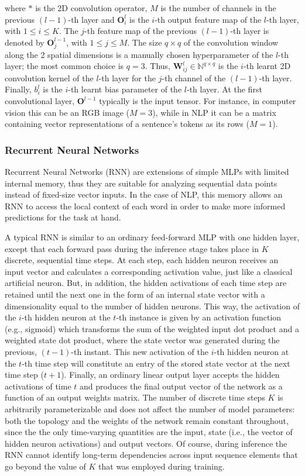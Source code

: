\documentclass[preprint,review,10pt]{elsarticle}
\begin{document}
	\noindent where $*$ is the 2D convolution operator, $M$ is the number of channels in the previous $(l-1)$-th layer and $\mathbf{O}_i^l$ is the $i$-th output feature map of the $l$-th layer, with $1 \leq i \leq K$. The $j$-th feature map of the previous $(l-1)$-th layer is denoted by $\mathbf{O}_j^{l-1}$, with $1 \leq j \leq M$. The size $q \times q$ of the convolution window along the 2 spatial dimensions is a manually chosen hyperparameter of the $l$-th layer; the most common choice is $q = 3$. Thus, $\mathbf{W}_{ij}^l \in \mathbb{N}^{q \times q}$ is the $i$-th learnt 2D convolution kernel of the $l$-th layer for the $j$-th channel of the $(l-1)$-th layer. Finally, $b_i^l$ is the $i$-th learnt bias parameter of the $l$-th layer. At the first convolutional layer, $\mathbf{O}^{l-1}$  typically is the input tensor. For instance, in computer vision this can be an RGB image ($M = 3$), while in NLP it can be a matrix containing vector representations of a sentence's tokens as its rows ($M = 1$).
	
	\subsubsection{Recurrent Neural Networks}
	Recurrent Neural Networks (RNN) are extensions of simple MLPs with limited internal memory, thus they are suitable for analyzing sequential data points instead of fixed-size vector inputs. In the case of NLP, this memory allows an RNN to access the local context of each word in order to make more informed predictions for the task at hand.
	
	A typical RNN is similar to an ordinary feed-forward MLP with one hidden layer, except that each forward pass during the inference stage takes place in $K$ discrete, sequential time steps. At each step, each hidden neuron receives an input vector and calculates a corresponding activation value, just like a classical artificial neuron. But, in addition, the hidden activations of each time step are retained until the next one in the form of an internal state vector with a dimensionality equal to the number of hidden neurons. This way, the activation of the $i$-th hidden neuron at the $t$-th instance is given by an activation function (e.g., sigmoid) which transforms the sum of the weighted input dot product and a weighted state dot product, where the state vector was generated during the previous, $(t-1)$-th instant. This new activation of the $i$-th hidden neuron at the $t$-th time step will constitute an entry of the stored state vector at the next time step ($t+1$). Finally, an ordinary linear output layer accepts the hidden activations of time $t$ and produces the final output vector of the network as a function of an output weights matrix. The number of discrete time steps $K$ is arbitrarily parameterizable and does not affect the number of model parameters: both the topology and the weights of the network remain constant throughout, since the the only time-varying quantities are the input, state (i.e., the vector of hidden neuron activations) and output vectors. Of course, during inference the RNN cannot identify long-term dependencies across input sequence elements that go beyond the value of $K$ that was employed during training.
	
\end{document}
